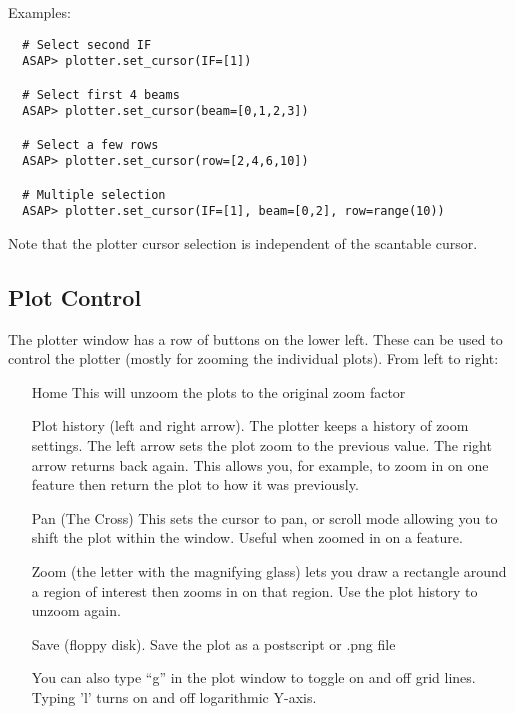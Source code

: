 \documentclass[11pt]{article}
\begin{document}
Examples:

\begin{verbatim}
  # Select second IF
  ASAP> plotter.set_cursor(IF=[1])

  # Select first 4 beams
  ASAP> plotter.set_cursor(beam=[0,1,2,3])

  # Select a few rows
  ASAP> plotter.set_cursor(row=[2,4,6,10])

  # Multiple selection
  ASAP> plotter.set_cursor(IF=[1], beam=[0,2], row=range(10))
\end{verbatim}

Note that the plotter cursor selection is independent of the scantable
cursor.

\subsection{Plot Control}

The plotter window has a row of buttons on the
lower left. These can be used to control the plotter (mostly for
zooming the individual plots). From left to right:

\begin{itemize}

\item[Home] This will unzoom the plots to the original zoom factor

\item[Plot history] (left and right arrow). The plotter keeps a
history of zoom settings. The left arrow sets the plot zoom to the
previous value. The right arrow returns back again. This allows you,
for example, to zoom in on one feature then return the plot to how it
was previously.

\item[Pan] (The Cross) This sets the cursor to pan, or scroll mode
       allowing you to shift the plot within the window. Useful when
       zoomed in on a feature.

\item[Zoom] (the letter with the magnifying glass) lets you draw a
       rectangle around a region of interest then zooms in on that
       region. Use the plot history to unzoom again.

\item[Save] (floppy disk). Save the plot as a postscript or .png file

You can also type ``g'' in the plot window to toggle on and off grid
lines. Typing 'l' turns on and off logarithmic Y-axis.

\end{itemize}
\end{document}
